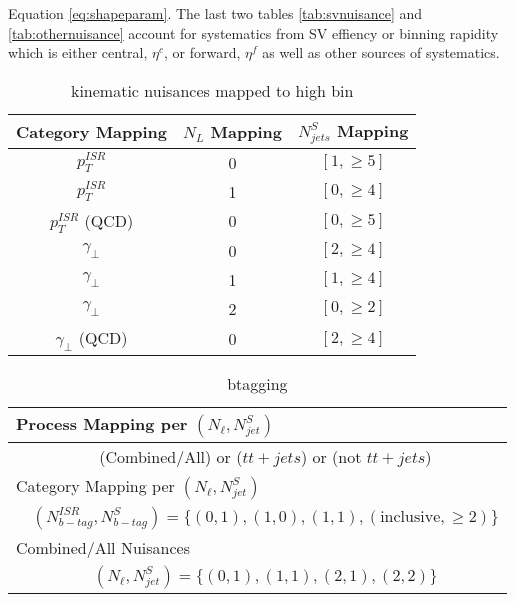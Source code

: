 Equation \ref{eq:shapeparam}. The last two tables \ref{tab:svnuisance} and \ref{tab:othernuisance} account for systematics from SV effiency or binning rapidity which is either central, $\eta^c$, or forward, $\eta^f$ as well as other sources of systematics.

\begin{table}
\caption{kinematic nuisances mapped to high bin}
\begin{tabular}{ccc}
\hline 
Category Mapping & $N_L$ Mapping & $N_{jets}^S$  Mapping \\ 
\hline 
\hline
$p_T^{ISR}$  & 0 & $[1,\geq5]$ \\ 
$p_T^{ISR}$ & 1 & $[0,\geq4]$ \\ 
$p_T^{ISR}$ (QCD) & 0 & $[0,\geq5]$ \\ 
$\gamma_\perp$ & 0 & $[2,\geq4]$ \\ 
$\gamma_\perp$ & 1 & $[1,\geq4]$ \\ 
$\gamma_\perp$ & 2 & $[0,\geq2]$ \\  
$\gamma_\perp$ (QCD) & 0 & $[2,\geq4]$ \\ 
\hline 
\end{tabular} 
\label{tab:kinnuisance}
\end{table}


\begingroup

\begin{table}
\caption{btagging}
\setlength{\tabcolsep}{10pt} %
\renewcommand{\arraystretch}{1.5} %
\begin{tabular}{lc}

\multicolumn{2}{|l}{Process Mapping per $(N_\ell,N_{jet}^S)$ } \\ 
\hline 
 & (Combined/All) or ($tt+jets$) or (not $tt+jets$)  \\ 
\multicolumn{2}{|l}{Category Mapping per $(N_\ell,N_{jet}^S)$ } \\ 
\hline 
 & $(N_{b-tag}^{ISR},N_{b-tag}^S)=\{(0,1),(1,0),(1,1),( \text{inclusive} ,\geq2) \}$ \\ 
\multicolumn{2}{|l}{Combined/All Nuisances}  \\ 
\hline 
 & $(N_\ell,N_{jet}^S)=\{(0,1),(1,1),(2,1),(2,2) \}$ \\ 

\end{tabular} 
\label{tab:btagnuisance}
\end{table}
\endgroup

